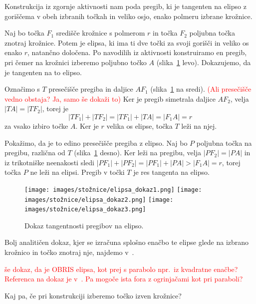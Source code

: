 \begin{trditev}
    Konstrukcija iz zgornje aktivnosti nam poda pregib, ki je tangenten na elipso z goriščema v obeh izbranih točkah in veliko osjo, enako polmeru izbrane krožnice.
\end{trditev}

\begin{dokaz}
    Naj bo točka $F_1$ središče krožnice s polmerom $r$ in točka $F_2$ poljubna točka znotraj krožnice. Potem je elipsa, ki ima ti dve točki za svoji gorišči in veliko os enako $r$, natančno določena. Po navodilih iz aktivnosti konstruiramo en pregib, pri čemer na krožnici izberemo poljubno točko $A$ (slika~\ref{fig:dokaz_elipsa} levo). Dokazujemo, da je tangenten na to elipso.

    Označimo s $T$ presečišče pregiba in daljice $AF_1$ (slika~\ref{fig:dokaz_elipsa} na sredi). \textcolor{red}{(Ali presečišče vedno obstaja? Ja, samo še dokaži to)} Ker je pregib simetrala daljice $AF_2$, velja $|TA| = |TF_2|$, torej je
    $$|TF_1| + |TF_2| = |TF_1| + |TA| = |F_1A| = r$$
    za vsako izbiro točke $A$. Ker je $r$ velika os elipse, točka $T$ leži na njej.

    Pokažimo, da je to edino presečišče pregiba z elipso. Naj bo $P$ poljubna točka na pregibu, različna od $T$ (slika~\ref{fig:dokaz_elipsa} desno). Ker leži na pregibu, velja $|PF_2| = |PA|$ in iz trikotniške neenakosti sledi $|PF_1| + |PF_2| = |PF_1| + |PA| > |F_1A| = r$, torej točka $P$ ne leži na elipsi. Pregib v točki $T$ je res tangenta na elipso.

    \begin{figure}[h]
        \centering
        \texttt{[image: images/stožnice/elipsa\_dokaz1.png]}
        \texttt{[image: images/stožnice/elipsa\_dokaz2.png]}
        \texttt{[image: images/stožnice/elipsa\_dokaz3.png]}
        \caption[Tangentnost na elipso]{Dokaz tangentnosti pregibov na elipso.}
        \label{fig:dokaz_elipsa}
    \end{figure}  
\end{dokaz}

Bolj analitičen dokaz, kjer se izračuna splošno enačbo te elipse glede na izbrano krožnico in točko znotraj nje, najdemo v~\cite[str.\ 204--205]{smith2003}.

\textcolor{red}{še dokaz, da je OBRIS elipsa, kot prej s parabolo npr.\ iz kvadratne enačbe? Referenca na dokaz je v~\cite[str.\ 60]{hull2013}. Pa mogoče ista fora z ogrinjačami kot pri paraboli?}

Kaj pa, če pri konstrukciji izberemo točko izven krožnice?

